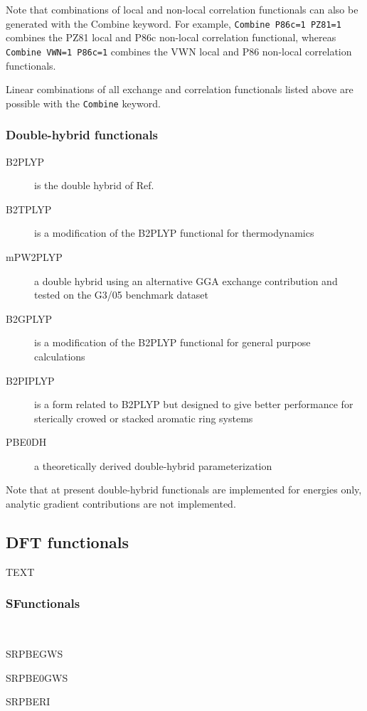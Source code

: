 Note that combinations of local and non-local correlation functionals
can also be generated with the Combine keyword. For example,
\verb|Combine P86c=1 PZ81=1| combines the PZ81 local and P86c non-local 
correlation functional, whereas \verb|Combine VWN=1 P86c=1| 
combines the VWN local and P86 non-local correlation functionals.


Linear combinations of all exchange and correlation functionals listed above
are possible with the \verb|Combine| keyword.

\subsubsection{Double-hybrid functionals}
\begin{description}
\item[B2PLYP] is the double hybrid of Ref.~\cite{dft:b2plyp}

\item[B2TPLYP] is a modification of the B2PLYP functional for thermodynamics~\cite{dft:b2tplyp}

\item[mPW2PLYP] a double hybrid using an alternative GGA exchange contribution and tested on the G3/05 benchmark dataset~\cite{dft:mpw2plyp}

\item[B2GPLYP] is a modification of the B2PLYP functional for general purpose calculations~\cite{dft:b2tplyp}

\item[B2PIPLYP] is a form related to B2PLYP but designed to give better performance for sterically crowed or stacked aromatic ring systems~\cite{dft:b2piplyp}

\item[PBE0DH] a theoretically derived double-hybrid parameterization~\cite{dft:pbe0dh}

\end{description}

Note that at present double-hybrid functionals are implemented for energies only, analytic gradient contributions are not implemented.
\pagebreak[3]

\subsection{\label{ref-dft}DFT functionals}

TEXT

\subsubsection{SFunctionals}
\providecommand\onefn[1]{#1}
\begin{description}

\item[SRLDA] ~\cite{dft:lb94}

\item{SRPBEGWS} 

\item{SRPBE0GWS}

\item{SRPBERI}

\end{description}

